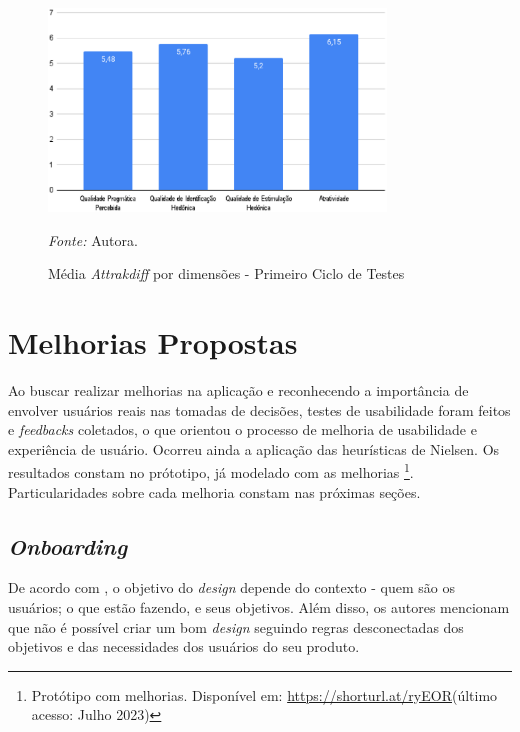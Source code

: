 \begin{figure}[h!]
	\centering
	\caption{Média \textit{Attrakdiff} por dimensões - Primeiro Ciclo de Testes}
	\begin{adjustbox}{center}
		\includegraphics[width=0.8\textwidth]{figuras/media-separada.eps}
	\end{adjustbox}
	\begin{tablenotes}[flushleft]
		\centering
		\item \textit{Fonte:} Autora.
	\end{tablenotes}
	\label{fig21}
\end{figure}

\section{Melhorias Propostas}
\label{sec:Melhorias Propostas}
Ao buscar realizar melhorias na aplicação e reconhecendo a importância de envolver usuários reais nas tomadas de decisões, testes de usabilidade foram feitos e \textit{feedbacks} coletados, 
o que orientou o processo de melhoria de usabilidade e experiência de usuário. Ocorreu ainda a aplicação das heurísticas de Nielsen. Os resultados constam no prótotipo, já modelado com as melhorias
\footnote{Protótipo com melhorias. Disponível em: \url{https://shorturl.at/ryEOR}(último acesso: Julho 2023)}. Particularidades sobre cada melhoria constam nas próximas seções.

\subsection{\textit{Onboarding}}
\label{sec:Onboarding}
De acordo com , o objetivo do \textit{design} depende do contexto - quem são os usuários; o que estão fazendo, e seus objetivos. Além disso, os autores mencionam que não é possível 
criar um bom \textit{design} seguindo regras desconectadas dos objetivos e das necessidades dos usuários do seu produto. 

